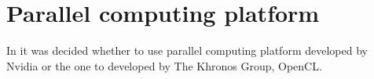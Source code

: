 \section{Parallel computing platform}
In  it was decided whether to use parallel computing platform developed by Nvidia or the one to developed by The Khronos Group, OpenCL.